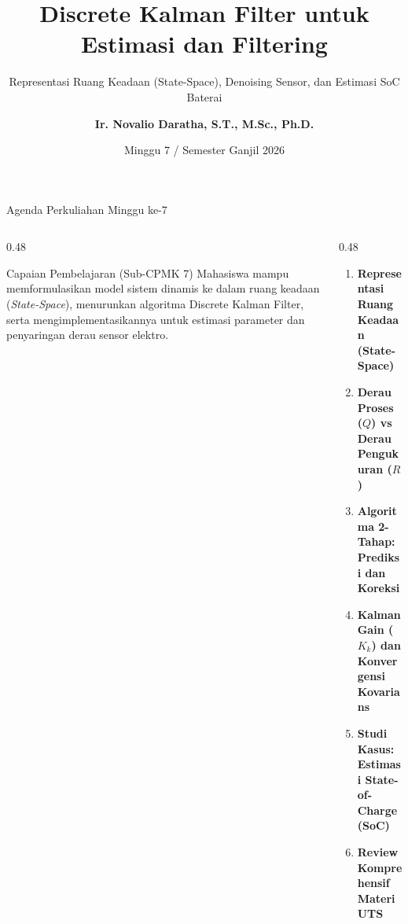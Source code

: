 \documentclass[aspectratio=169, 10pt]{beamer}
\title[\textbf{Deret Waktu (Minggu 7)}]{\textbf{Discrete Kalman Filter untuk Estimasi dan Filtering}}
\subtitle{Representasi Ruang Keadaan (State-Space), Denoising Sensor, dan Estimasi SoC Baterai}
\author[\textbf{Ir. Novalio Daratha, Ph.D.}]{\textbf{Ir. Novalio Daratha, S.T., M.Sc., Ph.D.}}
\institute[FT UNIB]{Program Studi Teknik Elektro -- Fakultas Teknik\\Universitas Bengkulu}
\date{Minggu 7 / Semester Ganjil 2026}
\begin{document}
\begin{frame}[plain]
    \titlepage
\end{frame}

\begin{frame}{Agenda Perkuliahan Minggu ke-7}
    \begin{columns}[T]
        \begin{column}{0.48\textwidth}
            \begin{block}{Capaian Pembelajaran (Sub-CPMK 7)}
                Mahasiswa mampu memformulasikan model sistem dinamis ke dalam ruang keadaan (\textit{State-Space}), menurunkan algoritma Discrete Kalman Filter, serta mengimplementasikannya untuk estimasi parameter dan penyaringan derau sensor elektro.
            \end{block}
        \end{column}
        \begin{column}{0.48\textwidth}
            \begin{enumerate}
                \item \textbf{Representasi Ruang Keadaan (State-Space)}
                \item \textbf{Derau Proses ($Q$) vs Derau Pengukuran ($R$)}
                \item \textbf{Algoritma 2-Tahap: Prediksi dan Koreksi}
                \item \textbf{Kalman Gain ($K_k$) dan Konvergensi Kovarians}
                \item \textbf{Studi Kasus: Estimasi State-of-Charge (SoC)}
                \item \textbf{Review Komprehensif Materi UTS}
            \end{enumerate}
        \end{column}
    \end{columns}
\end{frame}
\end{document}
